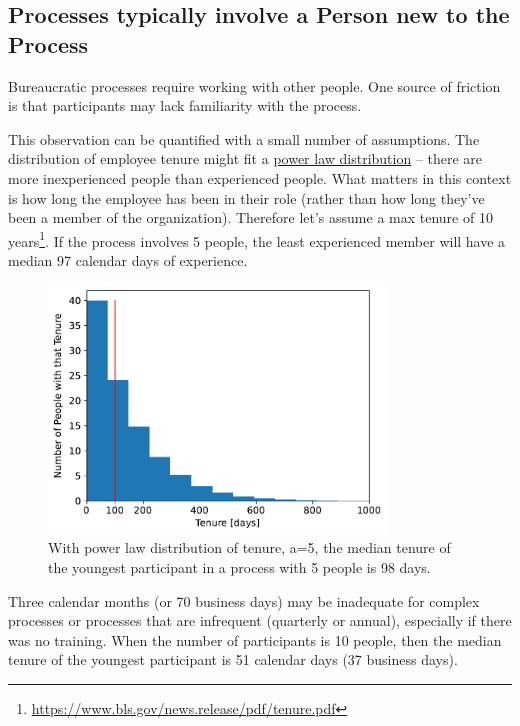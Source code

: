 \subsection*{Processes typically involve a Person new to the Process}


Bureaucratic processes require working with other people. One source of friction is that participants may lack familiarity with the process. 

This observation can be quantified with a small number of assumptions. The distribution of employee tenure might fit a \href{https://en.wikipedia.org/wiki/Power_law}{power law distribution} -- there are more inexperienced people than experienced people. What matters in this context is how long the employee has been in their role (rather than how long they've been a member of the organization). Therefore let's assume a max tenure of 10 years\footnote{\href{https://www.bls.gov/news.release/pdf/tenure.pdf}{https://www.bls.gov/news.release/pdf/tenure.pdf}}. If the process involves 5 people, the least experienced member will have a median 97 calendar days of experience.

\begin{figure}[H]
    \centering
    \includegraphics[width=0.8\textwidth]{images/tenure_power_distribution_a5_with_max_tenure10_and_5_participants.pdf}
    \caption{With power law distribution of tenure, a=5,
the median tenure of the youngest participant
 in a process with 5 people is 98 days.}
    \label{fig:tenure-powerlaw-5-participants-tenure10}
\end{figure}


Three calendar months (or 70 business days) may be inadequate for complex processes or processes that are infrequent (quarterly or annual), especially if there was no training. When the number of participants is 10 people, then the median tenure of the youngest participant is 51 calendar days (37 business days).


